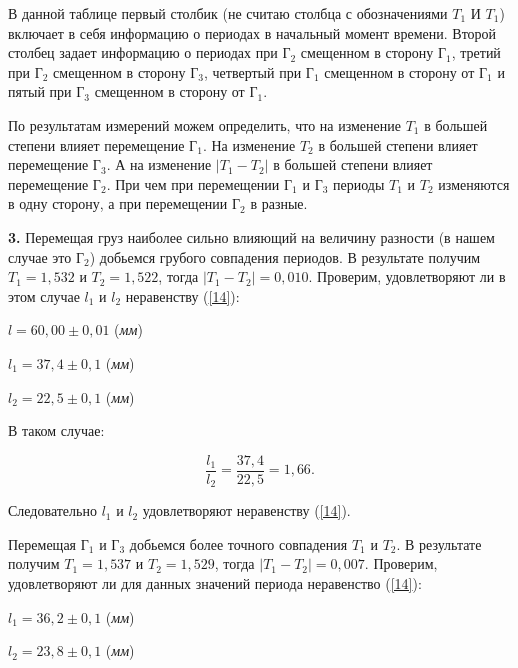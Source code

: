 \documentclass[12pt,a4paper]{article}
\begin{document}
\vspace{0,5cm}

В данной таблице первый столбик (не считаю столбца с обозначениями $\textit{T}_1$ И $\textit{T}_1$) включает в себя информацию о периодах в начальный момент времени. Второй столбец задает информацию о периодах при $\textit{Г}_2$ смещенном в сторону $\textit{Г}_1$, третий при $\textit{Г}_2$ смещенном в сторону $\textit{Г}_3$, четвертый при $\textit{Г}_1$ смещенном в сторону от $\textit{Г}_1$ и пятый при $\textit{Г}_3$ смещенном в сторону от $\textit{Г}_1$.

По результатам измерений можем определить, что на изменение $\textit{T}_1$ в большей степени влияет перемещение $\textit{Г}_1$. На изменение $\textit{T}_2$ в большей степени влияет перемещение $\textit{Г}_3$. А на изменение $\vert\textit{T}_1 - \textit{T}_2\vert$ в большей степени влияет перемещение $\textit{Г}_2$. При чем при перемещении $\textit{Г}_1$ и $\textit{Г}_3$ периоды $\textit{T}_1$ и $\textit{T}_2$ изменяются в одну сторону, а при перемещении $\textit{Г}_2$ в разные.

\vspace{0,5cm}

\textbf{3.} Перемещая груз наиболее сильно влияющий на величину разности (в нашем случае это $\textit{Г}_2$) добьемся грубого совпадения периодов. В результате получим $\textit{T}_1 = 1,532$ и $\textit{T}_2 = 1,522$, тогда $\vert\textit{T}_1 - \textit{T}_2\vert = 0,010$. Проверим, удовлетворяют ли в этом случае $\textit{l}_1$ и $\textit{l}_2$ неравенству (\ref{14}): 

$\textit{l} = 60,00\pm0,01$ (\textit{мм})

$\textit{l}_1 = 37,4\pm0,1$ (\textit{мм})

$\textit{l}_2 = 22,5\pm0,1$ (\textit{мм})

В таком случае:

\[ \frac{l_1}{l_2} = \frac{37,4}{22,5} = 1,66. \]

Следовательно $\textit{l}_1$ и $\textit{l}_2$ удовлетворяют неравенству (\ref{14}).

Перемещая $\textit{Г}_1$ и $\textit{Г}_3$ добьемся более точного совпадения $\textit{T}_1$ и $\textit{T}_2$. В результате получим $\textit{T}_1 = 1,537$ и $\textit{T}_2 = 1,529$, тогда $\vert\textit{T}_1 - \textit{T}_2\vert = 0,007$. Проверим, удовлетворяют ли для данных значений периода неравенство (\ref{14}):

$\textit{l}_1 = 36,2\pm0,1$ (\textit{мм})

$\textit{l}_2 = 23,8\pm0,1$ (\textit{мм})
\end{document}
